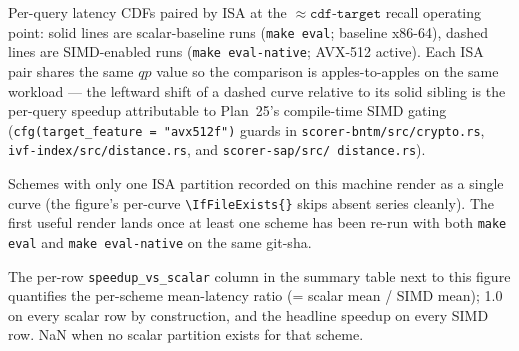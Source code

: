 Per-query latency CDFs paired by ISA at the
$\approx{}\mathtt{cdf\text{-}target}$ recall operating point: solid
lines are scalar-baseline runs (\texttt{make eval}; baseline
x86-64), dashed lines are SIMD-enabled runs (\texttt{make
eval-native}; AVX-512 active). Each ISA pair shares the same
$qp$ value so the comparison is apples-to-apples on the same
workload --- the leftward shift of a dashed curve relative to
its solid sibling is the per-query speedup attributable to
Plan~25's compile-time SIMD gating (\texttt{cfg(target\_feature
= "avx512f")} guards in \texttt{scorer-bntm/src/crypto.rs},
\texttt{ivf-index/src/distance.rs}, and \texttt{scorer-sap/src/
distance.rs}).

Schemes with only one ISA partition recorded on this machine
render as a single curve (the figure's per-curve
\texttt{\textbackslash IfFileExists\{\}} skips absent series
cleanly). The first useful render lands once at least one scheme
has been re-run with both \texttt{make eval} and \texttt{make
eval-native} on the same git-sha.

The per-row \texttt{speedup\_vs\_scalar} column in the summary
table next to this figure quantifies the per-scheme mean-latency
ratio (= scalar mean / SIMD mean); 1.0 on every scalar row by
construction, and the headline speedup on every SIMD row. NaN
when no scalar partition exists for that scheme.
